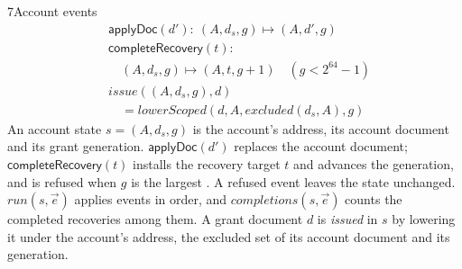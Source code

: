 \begin{perchdefinition}{7}{Account events}\label{def:account-events}
\[\begin{aligned}&\mathsf{applyDoc}(d'):\ (A, d_s, g) \mapsto (A, d', g)\\
&\mathsf{completeRecovery}(t):\\
&\quad (A, d_s, g) \mapsto (A, t, g + 1) \quad (g < 2^{64} - 1)\\
&\mathit{issue}((A, d_s, g), d)\\
&\quad = \mathit{lowerScoped}(d, A, \mathit{excluded}(d_s, A), g)\end{aligned}\]
An account state \(s = (A, d_s, g)\) is the account's address, its account document and its grant generation. \(\mathsf{applyDoc}(d')\) replaces the account document; \(\mathsf{completeRecovery}(t)\) installs the recovery target \(t\) and advances the generation, and is refused when \(g\) is the largest . A refused event leaves the state unchanged. \(\mathit{run}(s, \vec e)\) applies events in order, and \(\mathit{completions}(s, \vec e)\) counts the completed recoveries among them. A grant document \(d\) is \emph{issued} in \(s\) by lowering it under the account's address, the excluded set of its account document and its generation.
\end{perchdefinition}
